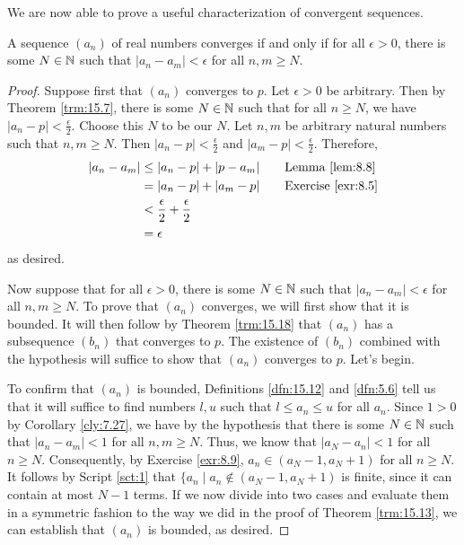 \documentclass[../main.tex]{subfiles}
\begin{document}
We are now able to prove a useful characterization of convergent sequences.

\begin{theorem}\label{trm:15.19}
    A sequence $(a_n)$ of real numbers converges if and only if for all $\epsilon>0$, there is some $N\in\mathbb{N}$ such that $|a_n-a_m|<\epsilon$ for all $n,m\geq N$.
    \begin{proof}
        Suppose first that $(a_n)$ converges to $p$. Let $\epsilon>0$ be arbitrary. Then by Theorem \ref{trm:15.7}, there is some $N\in\mathbb{N}$ such that for all $n\geq N$, we have $|a_n-p|<\frac{\epsilon}{2}$. Choose this $N$ to be our $N$. Let $n,m$ be arbitrary natural numbers such that $n,m\geq N$. Then $|a_n-p|<\frac{\epsilon}{2}$ and $|a_m-p|<\frac{\epsilon}{2}$. Therefore,
        \begin{align*}
            |a_n-a_m| &\leq |a_n-p|+|p-a_m|\tag*{Lemma \ref{lem:8.8}}\\
            &= |a_n-p|+|a_m-p|\tag*{Exercise \ref{exr:8.5}}\\
            &< \frac{\epsilon}{2}+\frac{\epsilon}{2}\\
            &= \epsilon
        \end{align*}
        as desired.\par\smallskip
        Now suppose that for all $\epsilon>0$, there is some $N\in\mathbb{N}$ such that $|a_n-a_m|<\epsilon$ for all $n,m\geq N$. To prove that $(a_n)$ converges, we will first show that it is bounded. It will then follow by Theorem \ref{trm:15.18} that $(a_n)$ has a subsequence $(b_n)$ that converges to $p$. The existence of $(b_n)$ combined with the hypothesis will suffice to show that $(a_n)$ converges to $p$. Let's begin.\par
        To confirm that $(a_n)$ is bounded, Definitions \ref{dfn:15.12} and \ref{dfn:5.6} tell us that it will suffice to find numbers $l,u$ such that $l\leq a_n\leq u$ for all $a_n$. Since $1>0$ by Corollary \ref{cly:7.27}, we have by the hypothesis that there is some $N\in\mathbb{N}$ such that $|a_n-a_m|<1$ for all $n,m\geq N$. Thus, we know that $|a_N-a_n|<1$ for all $n\geq N$. Consequently, by Exercise \ref{exr:8.9}, $a_n\in(a_N-1,a_N+1)$ for all $n\geq N$. It follows by Script \ref{sct:1} that $\{a_n\mid a_n\notin(a_N-1,a_N+1)$ is finite, since it can contain at most $N-1$ terms. If we now divide into two cases and evaluate them in a symmetric fashion to the way we did in the proof of Theorem \ref{trm:15.13}, we can establish that $(a_n)$ is bounded, as desired.\par

\end{proof}
\end{theorem}
\end{document}
